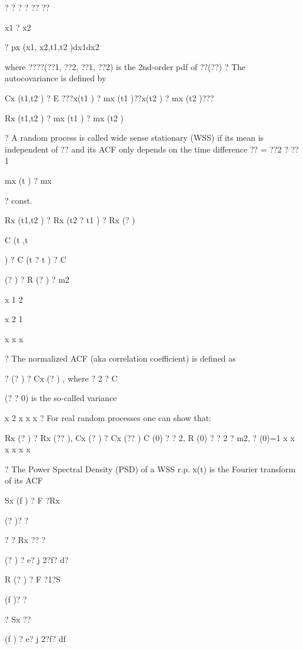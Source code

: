 \documentclass[2pt,landscape]{article}
\begin{document}
\begin{multicols*}{5}
?   ?
? ?
?? ??


x1 ? x2


? px (x1, x2,t1,t2 )dx1dx2





where ????(??1, ??2, ??1, ??2) is the 2nd-order pdf of ??(??)
?	The autocovariance is defined by

Cx (t1,t2 ) ? E ???x(t1 ) ? mx (t1 )??x(t2 ) ? mx (t2 )???  





Rx (t1,t2 ) ? mx (t1 ) ? mx (t2 )



?	A random process is called wide sense stationary (WSS) if its mean is 
independent of ?? and its ACF only depends on the time difference ?? = ??2 ? ??1



mx (t ) ? mx


? const.


Rx (t1,t2 ) ? Rx (t2 ? t1 ) ? Rx (? )


C (t ,t


) ? C (t ? t ) ? C


(? ) ? R (? ) ? m2


x	1	2


x	2	1


x	x	x


?	The normalized ACF (aka correlation coefficient) is defined as


? (? ) ? Cx (? ) ,	where ? 2 ? C



(? ? 0) is the so-called variance


x	2	x	x
x
?	For real random processes one can show that:


Rx (? ) ? Rx (?? ),	Cx (? ) ? Cx (?? )
C (0) ? ? 2,	R (0) ? ? 2 ? m2,	? (0)=1
x	x	x	x	x	x



?	The Power Spectral Density (PSD) of a WSS r.p. x(t) is the Fourier transform 
of its ACF


Sx (f ) ? F ?Rx


(? )? ?


?
? Rx
??
?


(? ) ? e? j 2?f? d?


R (? ) ? F ?1?S


(f )? ?


? Sx
??


(f ) ? e? j 2?f? df






\end{multicols*}
\end{document}
